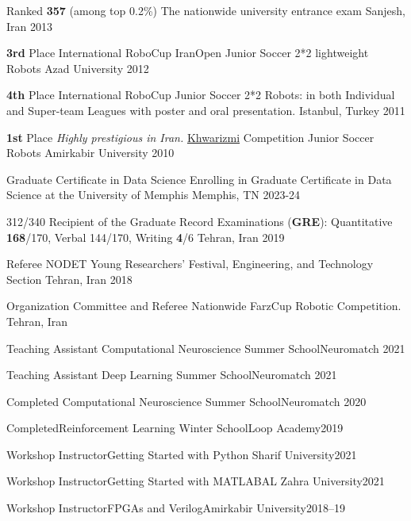 \begin{cvhonors}
\cvhonor
 {Ranked \textbf{357} (among top 0.2\%)}
 {The nationwide university entrance exam}
 {Sanjesh, Iran}
 {2013}
 
  \cvhonor
      {\textbf{3rd} Place}
      {International RoboCup IranOpen Junior Soccer 2*2 lightweight Robots}
      { Azad University}
        {2012}
        
   \cvhonor
   {\textbf{4th} Place}
    {International RoboCup Junior Soccer 2*2 Robots: in both Individual and Super-team Leagues with poster and oral presentation.}
    {Istanbul, Turkey}
	{2011}
  
    
  \cvhonor
  {\textbf{1st} Place}
  {\textit{Highly prestigious in Iran.}  \href{https://en.wikipedia.org/wiki/Khwarizmi_International_Award}{Khwarizmi} Competition Junior Soccer Robots}
  {Amirkabir University}
	{2010}
\end{cvhonors}

\pagebreak


\begin{cvhonors}
  
  \cvhonor
    {Graduate Certificate in Data Science} %
    {Enrolling in Graduate Certificate in Data Science at the University of Memphis}
    {Memphis, TN} %
    {2023-24} %

  \cvhonor
    {312/340} %
    {Recipient of the Graduate Record Examinations (\textbf{GRE}): Quantitative \textbf{168}/170, Verbal 144/170, Writing \textbf{4}/6} %
    {Tehran, Iran} %
    {2019} %
    
     \cvhonor
  {Referee}
  {NODET Young Researchers’ Festival, Engineering, and Technology Section}
  {Tehran, Iran}
	{2018}
 
  \cvhonor
    {Organization Committee and Referee}
    {Nationwide FarzCup Robotic Competition.}
    {Tehran, Iran}

    \cvhonor
    {Teaching Assistant}
    {Computational Neuroscience Summer School}{Neuromatch}
    {2021}

    \cvhonor
    {Teaching Assistant}
    {Deep Learning Summer School}{Neuromatch}
    {2021}

\cvhonor
{Completed}
{Computational Neuroscience Summer School}{Neuromatch}
{2020}

\cvhonor
{Completed}{Reinforcement Learning Winter School}{Loop Academy}{2019}

\cvhonor
{Workshop Instructor}{Getting Started with Python}{ Sharif University}{2021}

\cvhonor
{Workshop Instructor}{Getting Started with MATLAB}{AL Zahra University}{2021}

\cvhonor
{Workshop Instructor}{FPGAs and Verilog}{Amirkabir University}{2018–19}
\end{cvhonors}